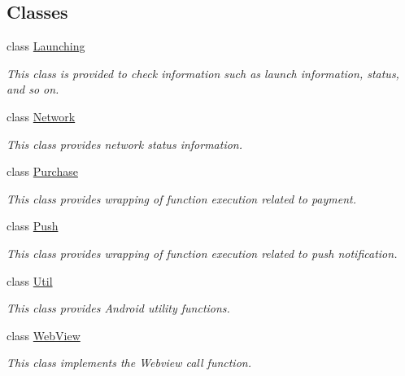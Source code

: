 \subsection*{Classes}
\begin{DoxyCompactItemize}
\item 
class \hyperlink{classcom_1_1toast_1_1android_1_1gamebase_1_1_gamebase_1_1_launching}{Launching}
\begin{DoxyCompactList}\small\item\em This class is provided to check information such as launch information, status, and so on. \end{DoxyCompactList}\item 
class \hyperlink{classcom_1_1toast_1_1android_1_1gamebase_1_1_gamebase_1_1_network}{Network}
\begin{DoxyCompactList}\small\item\em This class provides network status information. \end{DoxyCompactList}\item 
class \hyperlink{classcom_1_1toast_1_1android_1_1gamebase_1_1_gamebase_1_1_purchase}{Purchase}
\begin{DoxyCompactList}\small\item\em This class provides wrapping of function execution related to payment. \end{DoxyCompactList}\item 
class \hyperlink{classcom_1_1toast_1_1android_1_1gamebase_1_1_gamebase_1_1_push}{Push}
\begin{DoxyCompactList}\small\item\em This class provides wrapping of function execution related to push notification. \end{DoxyCompactList}\item 
class \hyperlink{classcom_1_1toast_1_1android_1_1gamebase_1_1_gamebase_1_1_util}{Util}
\begin{DoxyCompactList}\small\item\em This class provides Android utility functions. \end{DoxyCompactList}\item 
class \hyperlink{classcom_1_1toast_1_1android_1_1gamebase_1_1_gamebase_1_1_web_view}{Web\+View}
\begin{DoxyCompactList}\small\item\em This class implements the Webview call function. \end{DoxyCompactList}\end{DoxyCompactItemize}
